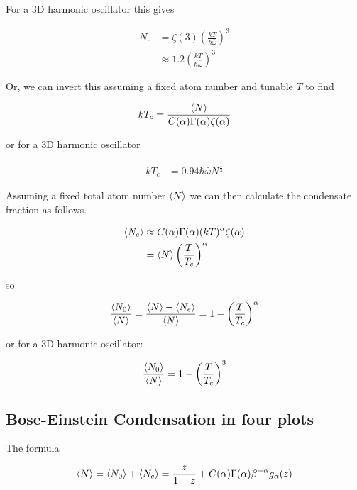 \documentclass[12pt]{article}
\begin{document}
For a 3D harmonic oscillator this gives

\begin{align}
N_c &= \zeta(3)\left(\frac{kT}{\hbar\bar{\omega}} \right)^3\\ &\approx 1.2 \left(\frac{kT}{\hbar\bar{\omega}}\right)^3
\end{align}

Or, we can invert this assuming a fixed atom number and tunable $T$ to find

\begin{align}
kT_c = \frac{\Braket{N}}{C(\alpha)\Gamma(\alpha)\zeta(\alpha)}
\end{align}

or for a 3D harmonic oscillator

\begin{align}
kT_c &= 0.94 \hbar \bar{\omega} N^{\frac{1}{3}}
\end{align}

Assuming a fixed total atom number $\Braket{N}$ we can then calculate the condensate fraction as follows.

\begin{align}
\Braket{N_e} &\approx C(\alpha)\Gamma(\alpha) (kT)^{\alpha} \zeta(\alpha)\\
&= \Braket{N} \left(\frac{T}{T_c}\right)^{\alpha}
\end{align}

so

\begin{align}
\frac{\Braket{N_0}}{\Braket{N}} = \frac{\Braket{N}-\Braket{N_e}}{\Braket{N}} = 1-\left(\frac{T}{T_c}\right)^{\alpha}
\end{align}

or for a 3D harmonic oscillator:

\begin{align}
\frac{\Braket{N_0}}{\Braket{N}} = 1-\left(\frac{T}{T_c}\right)^3
\end{align}


\subsection{Bose-Einstein Condensation in four plots}

The formula

\begin{align}
\Braket{N} = \Braket{N_0}+\Braket{N_e} &= \frac{z}{1-z} + C(\alpha)\Gamma(\alpha)\beta^{-\alpha}g_{\alpha}(z)\\
\end{align}
\end{document}
